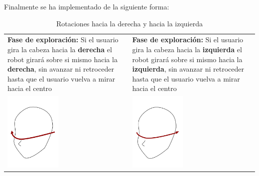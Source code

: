 \documentclass[twoside, 11pt]{epstfg}
\begin{document}
Finalmente se ha implementado de la siguiente forma:



\begin{table}[H]
	\begin{tabular}{p{7.0cm}  p{7.0cm}}
		\textbf{Fase de exploración:} Si el usuario gira la cabeza hacia la \textbf{derecha} el robot girará sobre si mismo hacia la \textbf{derecha}, sin avanzar ni retroceder hasta que el usuario vuelva a mirar hacia el centro & \textbf{Fase de exploración:} Si el usuario gira la cabeza hacia la \textbf{izquierda} el robot girará sobre si mismo hacia la \textbf{izquierda}, sin avanzar ni retroceder hasta que el usuario vuelva a mirar hacia el centro \\ 
		\centering\includegraphics[height=1.5in]{images/movder.png} & \centering\includegraphics[height=1.5in]{images/movderbuena.png} \\
		
	\end{tabular}
	\caption{Rotaciones hacia la derecha y hacia la izquierda}
	\label{movRobotRot}
\end{table}
\end{document}
